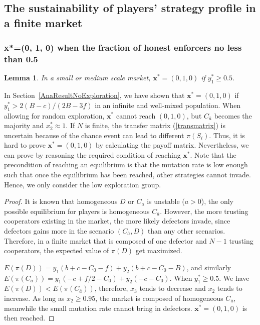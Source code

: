 \documentclass[letterpaper,10pt]{article}
\numberwithin{equation}{section}
\newtheorem{lemma}[theorem]{Lemma}
\begin{document}
\subsection{The sustainability of players' strategy profile in a finite market}\label{AppendixC2}
\subsubsection{x*=(0, 1, 0) when the fraction of honest enforcers no less than 0.5} \label{AppendixC21}

\begin{lemma}
    In a small or medium scale market, $ \mathbf{x}^* = (0,1,0) $ if $ y_{1}^* \geq 0.5 $.
\end{lemma}

In Section~\ref{AnaResultNoExploration}, we have shown that $ \mathbf{x}^* = (0, 1, 0) $ if $ y_{1}^{*} > 2(B - c)/(2B - 3f) $ in an infinite and well-mixed population. When allowing for random exploration, $ \mathbf{x}^* $ cannot reach $ (0, 1, 0) $, but $ C_{\bar{a}} $ becomes the majority and $ x_{2}^* \approx 1 $. If $ N $ is finite, the transfer matrix (\ref{transmatrix}) is uncertain because of the chance event can lead to different $ \pi(S_{i}) $. Thus, it is hard to prove $ \mathbf{x}^* = (0,1,0) $ by calculating the payoff matrix. Nevertheless, we can prove by reasoning the required condition of reaching $ \mathbf{x}^* $. Note that the precondition of reaching an equilibrium is that the mutation rate is low enough such that once the equilibrium has been reached, other strategies cannot invade. Hence, we only consider the low exploration group.

\begin{proof}
    It is known that homogeneous $ D $ or $ C_{a} $ is unstable ($ a>0 $), the only possible equilibrium for players is homogeneous $ C_{\bar{a}} $. However, the more trusting cooperators existing in the market, the more likely defectors invade, since defectors gains more in the scenario $ (C_{\bar{a}}, D) $ than any other scenarios. Therefore, in a finite market that is composed of one defector and $ N-1 $ trusting cooperators, the expected value of $ \pi(D) $ get maximized.
    
    $ E(\pi(D)) = y_{1}(b+c-C_0-f) + y_{2}(b+c-C_0-B) $, and similarly $ E(\pi(C_{\bar{a}})) = y_{1}(-c+f/2-C_0) + y_{2}(-c-C_0) $. When $ y_{1}^* \geq 0.5 $. We have $ E(\pi(D)) < E(\pi(C_{\bar{a}})) $, therefore, $ x_{3} $ tends to decrease and $ x_{2} $ tends to increase. As long as $ x_{2} \geq 0.95 $, the market is composed of homogeneous $ C_{\bar{a}} $, meanwhile the small mutation rate cannot bring in defectors. $ \mathbf{x}^* = (0,1,0) $ is then reached.
\end{proof}
\end{document}

